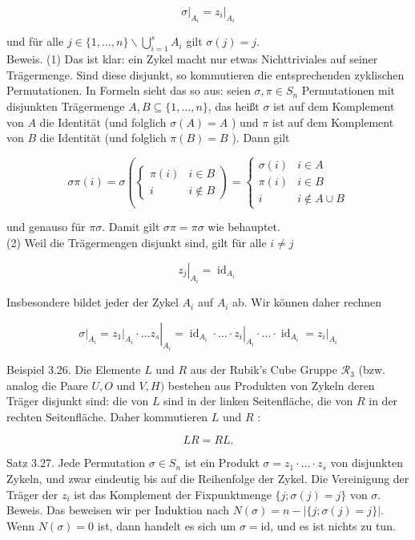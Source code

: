 \documentclass[10pt, letterpaper]{article}
\begin{document}
$$
\left.\sigma\right|_{A_{i}}=\left.z_{i}\right|_{A_{i}}
$$

und für alle $j \in\{1, \ldots, n\} \backslash \bigcup_{i=1}^{s} A_{i}$ gilt $\sigma(j)=j$.\\
Beweis. (1) Das ist klar: ein Zykel macht nur etwas Nichttriviales auf seiner Trägermenge. Sind diese disjunkt, so kommutieren die entsprechenden zyklischen Permutationen. In Formeln sieht das so aus: seien $\sigma, \pi \in S_{n}$ Permutationen mit disjunkten Trägermenge $A, B \subseteq\{1, \ldots, n\}$, das heißt $\sigma$ ist auf dem Komplement von $A$ die Identität (und folglich $\sigma(A)=A$ ) und $\pi$ ist auf dem Komplement von $B$ die Identität (und folglich $\pi(B)=B$ ). Dann gilt

$$
\sigma \pi(i)=\sigma\left(\left\{\begin{array}{ll}
\pi(i) & i \in B \\
i & i \notin B
\end{array}\right)= \begin{cases}\sigma(i) & i \in A \\
\pi(i) & i \in B \\
i & i \notin A \cup B\end{cases}\right.
$$

und genauso für $\pi \sigma$. Damit gilt $\sigma \pi=\pi \sigma$ wie behauptet.\\
(2) Weil die Trägermengen disjunkt sind, gilt für alle $i \neq j$

$$
\left.z_{j}\right|_{A_{i}}=\operatorname{id}_{A_{i}}
$$

Insbesondere bildet jeder der Zykel $A_{i}$ auf $A_{i}$ ab. Wir können daher rechnen

$$
\left.\sigma\right|_{A_{i}}=\left.\left.z_{1}\right|_{A_{i}} \cdot \ldots z_{s}\right|_{A_{i}}=\left.\operatorname{id}_{A_{i}} \cdot \ldots \cdot z_{i}\right|_{A_{i}} \cdot \ldots \cdot \operatorname{id}_{A_{i}}=\left.z_{i}\right|_{A_{i}}
$$

Beispiel 3.26. Die Elemente $L$ und $R$ aus der Rubik's Cube Gruppe $\mathscr{R}_{3}$ (bzw. analog die Paare $U, O$ und $V, H)$ bestehen aus Produkten von Zykeln deren Träger disjunkt sind: die von $L$ sind in der linken Seitenfläche, die von $R$ in der rechten Seitenfläche. Daher kommutieren $L$ und $R$ :

$$
L R=R L .
$$

Satz 3.27. Jede Permutation $\sigma \in S_{n}$ ist ein Produkt $\sigma=z_{1} \cdot \ldots \cdot z_{s}$ von disjunkten Zykeln, und zwar eindeutig bis auf die Reihenfolge der Zykel. Die Vereinigung der Träger der $z_{i}$ ist das Komplement der Fixpunktmenge $\{j ; \sigma(j)=j\}$ von $\sigma$.\\
Beweis. Das beweisen wir per Induktion nach $N(\sigma)=n-|\{j ; \sigma(j)=j\}|$. Wenn $N(\sigma)=0$ ist, dann handelt es sich um $\sigma=\mathrm{id}$, und es ist nichts zu tun.
\end{document}
